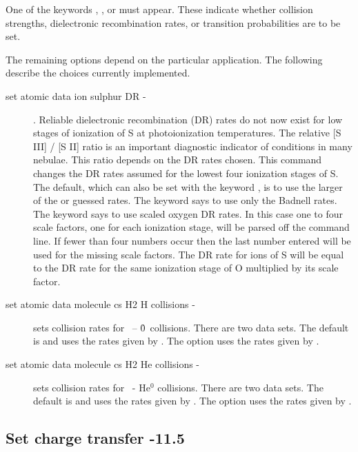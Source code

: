 One of the keywords , , or 
must appear.  These indicate whether collision strengths, dielectronic
recombination rates, or transition probabilities are to be set.

The remaining options depend on the particular application.
The following
describe the choices currently implemented.

\begin{description}

\item[set atomic data ion sulphur DR -] .
Reliable dielectronic recombination (DR) rates do not now exist for low
stages of ionization of S at photoionization temperatures.  The relative
[S III] / [S II] ratio is an important diagnostic indicator of conditions
in many nebulae.  This ratio depends on the DR rates chosen.  This command
changes the DR rates assumed for the lowest four ionization stages of S.
The default, which can also be set with the keyword , is to use the
larger of the \citet{Badnell1991} or guessed rates.  The keyword  says to
use only the Badnell rates.  The keyword  says to use scaled oxygen
DR rates.  In this case one to four scale factors, one for each ionization
stage, will be parsed off the command line.  If fewer than four numbers
occur then the last number entered will be used for the missing scale
factors.  The DR rate for ions of S will be equal to the DR rate for the
same ionization stage of O multiplied by its scale factor.

\item[set atomic data molecule cs H2 H collisions -] sets collision rates for
\htwo\ -- \h0\ collisions.  There are two data sets.  The default is
 and uses
the rates given by \citet{Wrathmall2007}.  The  option uses the rates
given by \citet{LeBourlot1999}.

\item[set atomic data molecule cs H2 He collisions -] sets collision rates for
\htwo\ - He$^0$ collisions.  There are two data sets.  The default is
 and
uses the rates given by \citet{LeeH2He2006}.  The  option uses the
rates given by \citet{LeBourlot1999}.
\end{description}

\subsection{Set charge transfer -11.5}


